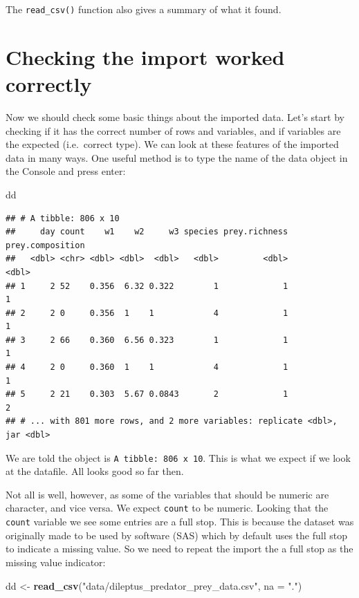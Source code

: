 \documentclass[]{book}
\newenvironment{Shaded}{\begin{snugshade}}{\end{snugshade}}
\newcommand{\DataTypeTok}[1]{\textcolor[rgb]{0.13,0.29,0.53}{#1}}
\newcommand{\KeywordTok}[1]{\textcolor[rgb]{0.13,0.29,0.53}{\textbf{#1}}}
\newcommand{\NormalTok}[1]{#1}
\newcommand{\StringTok}[1]{\textcolor[rgb]{0.31,0.60,0.02}{#1}}
\begin{document}
The \texttt{read\_csv()} function also gives a summary of what it found.

\hypertarget{checking-the-import-worked-correctly}{%
\section{Checking the import worked correctly}\label{checking-the-import-worked-correctly}}

Now we should check some basic things about the imported data. Let's start by checking if it has the correct number of rows and variables, and if variables are the expected (i.e.~correct type). We can look at these features of the imported data in many ways. One useful method is to type the name of the data object in the Console and press enter:

\begin{Shaded}
\begin{Highlighting}[]
\NormalTok{dd}
\end{Highlighting}
\end{Shaded}

\begin{verbatim}
## # A tibble: 806 x 10
##     day count    w1    w2     w3 species prey.richness prey.composition
##   <dbl> <chr> <dbl> <dbl>  <dbl>   <dbl>         <dbl>            <dbl>
## 1     2 52    0.356  6.32 0.322        1             1                1
## 2     2 0     0.356  1    1            4             1                1
## 3     2 66    0.360  6.56 0.323        1             1                1
## 4     2 0     0.360  1    1            4             1                1
## 5     2 21    0.303  5.67 0.0843       2             1                2
## # ... with 801 more rows, and 2 more variables: replicate <dbl>, jar <dbl>
\end{verbatim}

We are told the object is \texttt{A\ tibble:\ 806\ x\ 10}. This is what we expect if we look at the datafile. All looks good so far then.

Not all is well, however, as some of the variables that should be numeric are character, and vice versa. We expect \texttt{count} to be numeric. Looking that the \texttt{count} variable we see some entries are a full stop. This is because the dataset was originally made to be used by software (SAS) which by default uses the full stop to indicate a missing value. So we need to repeat the import the a full stop as the missing value indicator:

\begin{Shaded}
\begin{Highlighting}[]
\NormalTok{dd <-}\StringTok{ }\KeywordTok{read_csv}\NormalTok{(}\StringTok{"data/dileptus_predator_prey_data.csv"}\NormalTok{, }\DataTypeTok{na =} \StringTok{"."}\NormalTok{)}
\end{Highlighting}
\end{Shaded}
\end{document}
